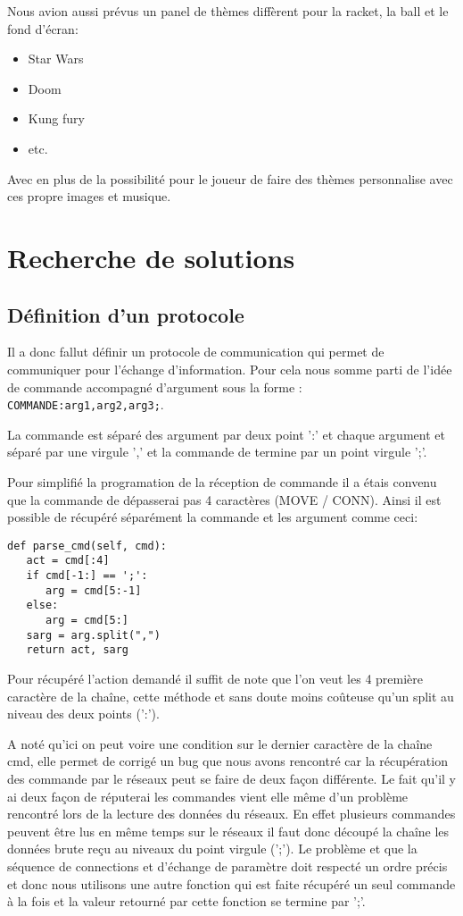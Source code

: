 \documentclass[12pt]{report}
\begin{document}
Nous avion aussi prévus un panel de thèmes diffèrent pour la racket, la ball et
le fond d'écran:
\begin{itemize}
\item Star Wars
\item Doom
\item Kung fury
\item etc.
\end{itemize}
Avec en plus de la possibilité pour le joueur de faire des thèmes personnalise
avec ces propre images et musique.

\part{Recherche de solutions}
\chapter{Définition d'un protocole}
Il a donc fallut définir un protocole de communication qui permet de communiquer
pour l'échange d'information.
Pour cela nous somme parti de l'idée de commande accompagné d'argument sous la
forme : \texttt{COMMANDE:arg1,arg2,arg3;}.

La commande est séparé des argument par deux point ':' et chaque argument et
séparé par une virgule ',' et la commande de termine par un point virgule ';'.

Pour simplifié la programation de la réception de commande il a étais convenu
que la commande de dépasserai pas 4 caractères (MOVE / CONN). Ainsi il est
possible de récupéré séparément la commande et les argument comme ceci:
\begin{verbatim}
def parse_cmd(self, cmd):
   act = cmd[:4]
   if cmd[-1:] == ';':
      arg = cmd[5:-1]
   else:
      arg = cmd[5:]
   sarg = arg.split(",")
   return act, sarg
\end{verbatim}

Pour récupéré l'action demandé il suffit de note que l'on veut les 4 première
caractère de la chaîne, cette méthode et sans doute moins coûteuse qu'un split
au niveau des deux points (':').

A noté qu'ici on peut voire une condition sur le dernier caractère de la chaîne
cmd, elle permet de corrigé un bug que nous avons rencontré car la récupération
des commande par le réseaux peut se faire de deux façon différente.
Le fait qu'il y ai deux façon de réputerai les commandes vient elle même d'un
problème rencontré lors de la lecture des données du réseaux. En effet
plusieurs commandes peuvent être lus en même temps sur le réseaux il faut
donc découpé la chaîne les données brute reçu au niveaux du point virgule
(';').
Le problème et que la séquence de connections et d'échange de paramètre doit
respecté un ordre précis et donc nous utilisons une autre fonction qui est
faite récupéré un seul commande à la fois et la valeur retourné par cette
fonction se termine par ';'.
\end{document}
